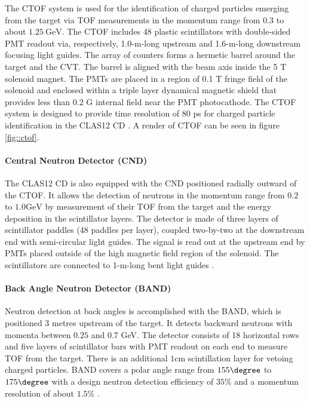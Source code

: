     The CTOF system is used for the identification of charged particles emerging from the target via TOF measurements in the momentum range from $0.3$ to about $1.25 ~\text{GeV}$.
    The CTOF includes 48 plastic scintillators with double-sided PMT readout via, respectively, 1.0-m-long upstream and 1.6-m-long downstream focusing light guides.
    The array of counters forms a hermetic barrel around the target and the CVT.
    The barrel is aligned with the beam axis inside the 5 T solenoid magnet.
    The PMTs are placed in a region of 0.1 T fringe field of the solenoid and enclosed within a triple layer dynamical magnetic shield that provides less than 0.2 G internal field near the PMT photocathode.
    The CTOF system is designed to provide time resolution of 80 ps for charged particle identification in the CLAS12 CD \cite{carman2020ctof}.
    A render of CTOF can be seen in figure \ref{fig::ctof}.

\paragraph{Central Neutron Detector (CND)}
    The CLAS12 CD is also equipped with the CND positioned radially outward of the CTOF.
    It allows the detection of neutrons in the momentum range from $0.2$ to $1.0 \text{GeV}$ by measurement of their TOF from the target and the energy deposition in the scintillator layers.
    The detector is made of three layers of scintillator paddles (48 paddles per layer), coupled two-by-two at the downstream end with semi-circular light guides.
    The signal is read out at the upstream end by PMTs placed outside of the high magnetic field region of the solenoid.
    The scintillators are connected to 1-m-long bent light guides \cite{chatagnon2020}.

\paragraph{Back Angle Neutron Detector (BAND)}
    Neutron detection at back angles is accomplished with the BAND, which is positioned 3 metres upstream of the target.
    It detects backward neutrons with momenta between $0.25$ and $0.7$ GeV.
    The detector consists of 18 horizontal rows and five layers of scintillator bars with PMT readout on each end to measure TOF from the target.
    There is an additional $1 \text{cm}$ scintillation layer for vetoing charged particles.
    BAND covers a polar angle range from $155\degree$ to $175\degree$ with a design neutron detection efficiency of $35\%$ and a momentum resolution of about $1.5\%$ \cite{segarra2020}.
